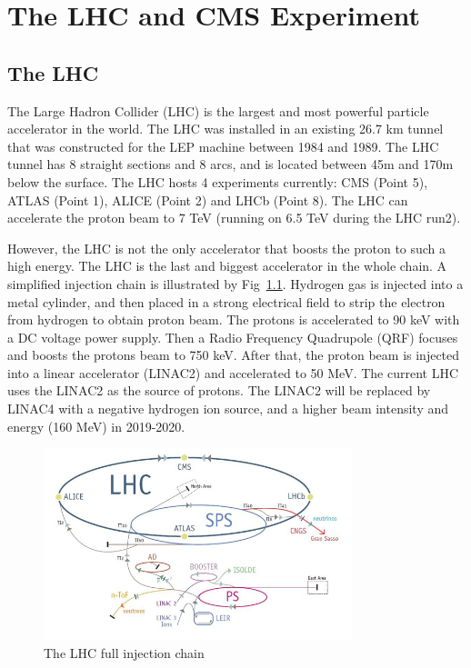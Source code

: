 \chapter{The LHC and CMS Experiment}

\clearpage
\section{The LHC}

The Large Hadron Collider (LHC) is the largest and most powerful particle accelerator in the world. The LHC was installed in an existing 26.7 km tunnel that was constructed for the LEP machine between 1984 and 1989. The LHC tunnel has 8 straight sections and 8 arcs, and is located between 45m and 170m below the surface. The LHC hosts 4 experiments currently: CMS (Point 5), ATLAS (Point 1), ALICE (Point 2) and LHCb (Point 8). The LHC can accelerate the proton beam to 7 TeV (running on 6.5 TeV during the LHC run2).

However, the LHC is not the only accelerator that boosts the proton to such a high energy. The LHC is the last and biggest accelerator in the whole chain. A simplified injection chain is illustrated by Fig~\ref{fig:c3lhclpsspslhc}. Hydrogen gas is injected into a metal cylinder, and then placed in a strong electrical field to strip the electron from hydrogen to obtain proton beam. The protons is accelerated to 90 keV with a DC voltage power supply. Then a Radio Frequency Quadrupole (QRF) focuses and boosts the protons beam to 750 keV. After that, the proton beam is injected into a linear accelerator (LINAC2) and accelerated to 50 MeV. The current LHC uses the LINAC2 as the source of protons. The LINAC2 will be replaced by LINAC4 with a negative hydrogen ion source, and a higher beam intensity and energy (160 MeV) in 2019-2020. 

\begin{figure}[htbp]
 \begin{center}
  \includegraphics[width=0.8\textwidth]{figures/c3/c3_lhc_lpsspslhc.jpg}
 \end{center}
 \caption{The LHC full injection chain}
 \label{fig:c3lhclpsspslhc}
\end{figure}

